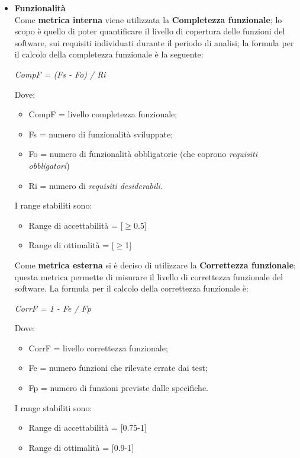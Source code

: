     \begin{itemize}
      \item \textbf{Funzionalità}\\
      Come \textbf{metrica interna} viene utilizzata la \textbf{Completezza funzionale};
      lo scopo è quello di poter quantificare il livello di copertura delle funzioni del software, sui requisiti individuati durante il periodo di analisi;
      la formula per il calcolo della completezza funzionale è la seguente:
      \begin{center}
        \emph{CompF = (Fs - Fo) / Ri}
      \end{center}
      Dove:
      \begin{itemize}
        \item CompF = livello completezza funzionale;
        \item Fs = numero di funzionalità sviluppate;
        \item Fo = numero di funzionalità obbligatorie (che coprono \emph{requisiti obbligatori})
        \item Ri = numero di \emph{requisiti desiderabili}.
      \end{itemize}
      I range stabiliti sono:
      \begin{itemize}
        \item Range di accettabilità = [\(\geq\)0.5]
        \item Range di ottimalità = [\(\geq\)1]
      \end{itemize}
      Come \textbf{metrica esterna} si è deciso di utilizzare la \textbf{Correttezza funzionale};
      questa metrica permette di misurare il livello di correttezza funzionale del software.
      La formula per il calcolo della correttezza funzionale è:
      \begin{center}
        \emph{CorrF = 1 - Fe / Fp}
      \end{center}
      Dove:
      \begin{itemize}
        \item CorrF = livello correttezza funzionale;
        \item Fe = numero funzioni che rilevate errate dai test;
        \item Fp = numero di funzioni previste dalle specifiche.
      \end{itemize}
      I range stabiliti sono:
      \begin{itemize}
        \item Range di accettabilità = [0.75-1]
        \item Range di ottimalità = [0.9-1]

\end{itemize}
\end{itemize}

